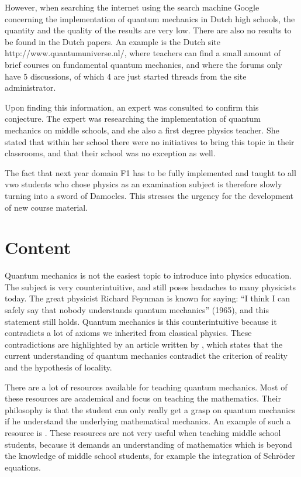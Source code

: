 \documentclass[11pt,twoside]{report} %
\begin{document}
However, when searching the internet using the search machine Google concerning the implementation of quantum mechanics in Dutch high schools, the quantity and the quality of the results are very low. There are also no results to be found in the Dutch papers. An example is the Dutch site http://www.quantumuniverse.nl/, where teachers can find a small amount of brief courses on fundamental quantum mechanics, and where the forums only have 5 discussions, of which 4 are just started threads from the site administrator.

Upon finding this information, an expert was consulted to confirm this conjecture. The expert was researching the implementation of quantum mechanics on middle schools, and she also a first degree physics teacher. She stated that within her school there were no initiatives to bring this topic in their classrooms, and that their school was no exception as well.

The fact that next year domain F1 has to be fully implemented and taught to all vwo students who chose physics as an examination subject is therefore slowly turning into a sword of Damocles. This stresses the urgency for the development of new course material.

\section{Content}

Quantum mechanics is not the easiest topic to introduce into physics education. The subject is very counterintuitive, and still poses headaches to many physicists today. The great physicist Richard Feynman is known for saying: “I think I can safely say that nobody understands quantum mechanics” (1965), and this statement still holds. Quantum mechanics is this counterintuitive because it contradicts a lot of axioms we inherited from classical physics. These contradictions are highlighted by an article written by , which states that the current understanding of quantum mechanics contradict the criterion of reality and the hypothesis of locality.

There are a lot of resources available for teaching quantum mechanics. Most of these resources are academical and focus on teaching the mathematics. Their philosophy is that the student can only really get a grasp on quantum mechanics if he understand the underlying mathematical mechanics. An example of such a resource is . These resources are not very useful when teaching middle school students, because it demands an understanding of mathematics which is beyond the knowledge of middle school students, for example the integration of Schröder equations.
\end{document}
